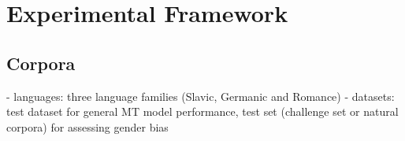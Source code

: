 \chapter{Experimental Framework}
\label{ch:Experiments}










\section{Corpora}
\label{sec:Experiments:Corpora}
- languages: three language families (Slavic, Germanic and Romance)
- datasets: test dataset for general MT model performance, test set (challenge set or natural corpora) for assessing gender bias


